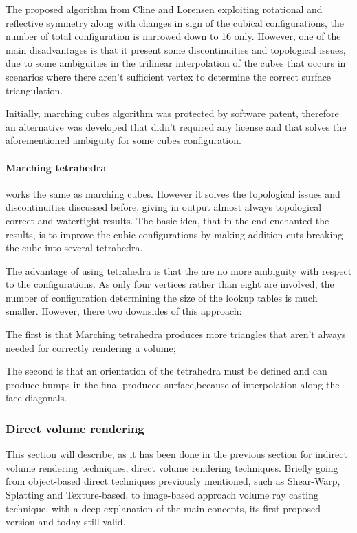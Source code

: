 \documentclass[10pt,a4paper]{article}
\begin{document}
The proposed algorithm from Cline and Lorensen exploiting rotational and reflective symmetry along with changes in sign of the cubical configurations, the number of total configuration is narrowed down to 16 only. However, one of the main disadvantages is that it present some discontinuities and topological issues, due to some ambiguities in the trilinear interpolation of the cubes that occurs in scenarios where there aren't sufficient vertex to determine the correct surface triangulation. %

Initially, marching cubes algorithm was protected by software patent, therefore an alternative was developed that didn't required any license and that solves the aforementioned ambiguity for some cubes configuration.

\paragraph{Marching tetrahedra} works the same as marching cubes. However it solves the topological issues and discontinuities discussed before, giving in output almost always topological correct and watertight results.
The basic idea, that in the end enchanted the results, is to improve the cubic configurations by making addition cuts breaking the cube into several tetrahedra.

The advantage of using tetrahedra is that the are no more ambiguity with respect to the configurations. As only four vertices rather than eight are involved, the number of configuration determining the size of the lookup tables is much smaller. However, there two downsides of this approach:

The first  is that Marching tetrahedra produces more triangles that aren't always needed for correctly rendering a volume; 

The second is that an orientation of the tetrahedra must be defined and can produce bumps in the final produced surface,because of interpolation along the face diagonals.

\subsubsection{Direct volume rendering} %
This section will describe, as it has been done in the previous section for indirect volume rendering techniques, direct volume rendering techniques. Briefly going from object-based direct techniques previously mentioned, such as Shear-Warp, Splatting and Texture-based, to image-based approach volume ray casting technique, with a deep explanation of the main concepts, its first proposed version and today still valid.
\end{document}
